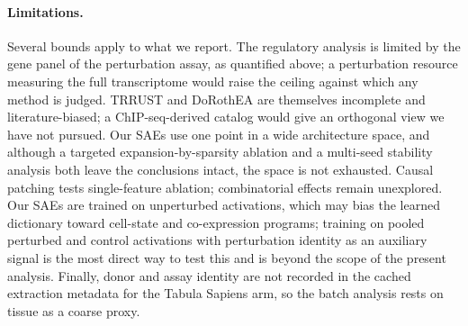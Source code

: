\paragraph{Limitations.}
Several bounds apply to what we report. The regulatory analysis is limited by the gene panel of the
perturbation assay, as quantified above; a perturbation resource measuring the full transcriptome
would raise the ceiling against which any method is judged. TRRUST and DoRothEA are themselves
incomplete and literature-biased; a ChIP-seq-derived catalog would give an orthogonal view we have
not pursued. Our SAEs use one point in a wide architecture space, and although a targeted
expansion-by-sparsity ablation and a multi-seed stability analysis both leave the conclusions
intact, the space is not exhausted. Causal patching tests single-feature ablation; combinatorial
effects remain unexplored. Our SAEs are trained on unperturbed activations, which may bias the
learned dictionary toward cell-state and co-expression programs; training on pooled perturbed and
control activations with perturbation identity as an auxiliary signal is the most direct way to test
this and is beyond the scope of the present analysis. Finally, donor and assay identity are not
recorded in the cached extraction metadata for the Tabula Sapiens arm, so the batch analysis rests
on tissue as a coarse proxy.
